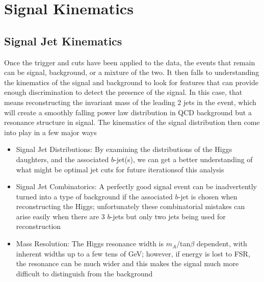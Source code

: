  

\chapter[Signal Kinematics]{Signal Kinematics}
 
\section{Signal Jet Kinematics}

Once the trigger and cuts have been applied to the data, the events that remain can be signal, background, or a mixture of the two.  
It then falls to understanding the kinematics of the signal and background to look for features that can
provide enough discrimination to detect the presence of the signal.  In this case, that means reconstructing
the invariant mass of the leading 2 jets in the event, which will create a smoothly falling power
law distribution in QCD background but a resonance structure in signal.  The kinematics of the signal
distribution then come into play in a few major ways
\begin{itemize}
    \item Signal Jet \pt Distributions:  By examining the \pt distributions of the Higgs daughters, and the associated $b$-jet(s), we can get a better understanding of what might be optimal jet \pt cuts for future iterationsof this analysis 
    \item Signal Jet Combinatorics: A perfectly good signal event can be inadvertently turned into a type of background if the associated $b$-jet is chosen when reconstructing the Higgs; unfortunately these combinatorial mistakes can arise easily when there are 3 $b$-jets but only two jets being used for reconstruction
    \item Mass Resolution: The Higgs resonance width is $m_A$/tan$\beta$ dependent, with inherent widths
up to a few tens of GeV; however, if energy is lost to FSR, the resonance can be much wider and this makes
the signal much more difficult to distinguish from the background
\end{itemize}

